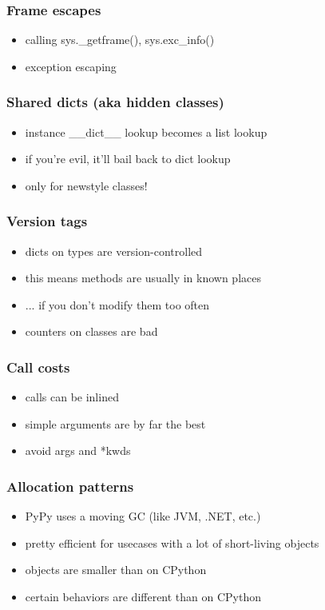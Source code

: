 \documentclass[utf8x, 14pt]{beamer}
\begin{document}
\begin{frame}
  \frametitle{Frame escapes}
  \begin{itemize}
    \item calling {\ttfamily sys.\_getframe()}, {\ttfamily sys.exc\_info()}
    \item exception escaping
  \end{itemize}
\end{frame}

\begin{frame}
  \frametitle{Shared dicts (aka hidden classes)}
  \begin{itemize}
    \item instance {\ttfamily \_\_dict\_\_ } lookup becomes a list lookup
    \item if you're evil, it'll bail back to dict lookup
      \pause
    \item only for newstyle classes!
  \end{itemize}
\end{frame}

\begin{frame}
  \frametitle{Version tags}
  \begin{itemize}
    \item dicts on types are version-controlled
    \item this means methods are usually in known places
      \pause
    \item ... if you don't modify them too often
    \item counters on classes are bad
  \end{itemize}
\end{frame}

\begin{frame}
  \frametitle{Call costs}
  \begin{itemize}
    \item calls can be inlined
    \item simple arguments are by far the best
    \item avoid {\ttfamily *args} and {\ttfamily **kwds}
  \end{itemize}
\end{frame}

\begin{frame}
  \frametitle{Allocation patterns}
  \begin{itemize}
    \item PyPy uses a moving GC (like JVM, .NET, etc.)
    \item pretty efficient for usecases with a lot of
      short-living objects
    \item objects are smaller than on CPython
    \item certain behaviors are different than on CPython
  \end{itemize}
\end{frame}
\end{document}
